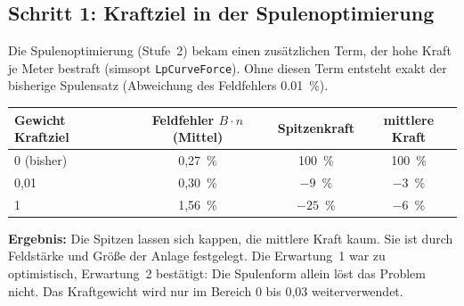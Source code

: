 \subsection*{Schritt 1: Kraftziel in der Spulenoptimierung}
Die Spulenoptimierung (Stufe~2) bekam einen zusätzlichen Term, der hohe Kraft je Meter bestraft (simsopt
\texttt{LpCurveForce}). Ohne diesen Term entsteht exakt der bisherige Spulensatz (Abweichung des Feldfehlers
\SI{0,01}{\%}).
\begin{center}\small
\begin{tabular}{lccc}
\toprule
Gewicht Kraftziel & Feldfehler $B\cdot n$ (Mittel) & Spitzenkraft & mittlere Kraft \\
\midrule
0 (bisher) & 0,27~\% & 100~\% & 100~\% \\
0,01 & 0,30~\% & $-9$~\% & $-3$~\% \\
1 & 1,56~\% & $-25$~\% & $-6$~\% \\
\bottomrule
\end{tabular}
\end{center}
\textbf{Ergebnis:} Die Spitzen lassen sich kappen, die mittlere Kraft kaum. Sie ist durch Feldstärke und Größe der
Anlage festgelegt. Die Erwartung~1 war zu optimistisch, Erwartung~2 bestätigt: Die Spulenform allein löst das
Problem nicht. Das Kraftgewicht wird nur im Bereich 0 bis 0,03 weiterverwendet.

